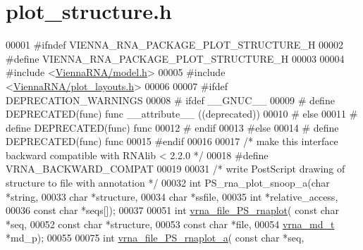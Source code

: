 \hypertarget{plot__structure_8h_source}{}\section{plot\+\_\+structure.\+h}
\label{plot__structure_8h_source}

\begin{DoxyCode}
00001 \textcolor{preprocessor}{#ifndef VIENNA\_RNA\_PACKAGE\_PLOT\_STRUCTURE\_H}
00002 \textcolor{preprocessor}{#define VIENNA\_RNA\_PACKAGE\_PLOT\_STRUCTURE\_H}
00003 
00004 \textcolor{preprocessor}{#include <\hyperlink{model_8h}{ViennaRNA/model.h}>}
00005 \textcolor{preprocessor}{#include <\hyperlink{plot__layouts_8h}{ViennaRNA/plot\_layouts.h}>}
00006 
00007 \textcolor{preprocessor}{#ifdef DEPRECATION\_WARNINGS}
00008 \textcolor{preprocessor}{# ifdef \_\_GNUC\_\_}
00009 \textcolor{preprocessor}{#  define DEPRECATED(func) func \_\_attribute\_\_ ((deprecated))}
00010 \textcolor{preprocessor}{# else}
00011 \textcolor{preprocessor}{#  define DEPRECATED(func) func}
00012 \textcolor{preprocessor}{# endif}
00013 \textcolor{preprocessor}{#else}
00014 \textcolor{preprocessor}{# define DEPRECATED(func) func}
00015 \textcolor{preprocessor}{#endif}
00016 
00017 \textcolor{comment}{/* make this interface backward compatible with RNAlib < 2.2.0 */}
00018 \textcolor{preprocessor}{#define VRNA\_BACKWARD\_COMPAT}
00019 
00031 \textcolor{comment}{/* write PostScript drawing of structure to file with annotation */}
00032 \textcolor{keywordtype}{int} PS\_rna\_plot\_snoop\_a(\textcolor{keywordtype}{char} *\textcolor{keywordtype}{string},
00033                         \textcolor{keywordtype}{char} *structure,
00034                         \textcolor{keywordtype}{char} *ssfile,
00035                         \textcolor{keywordtype}{int} *relative\_access,
00036                         \textcolor{keyword}{const} \textcolor{keywordtype}{char} *seqs[]);
00037 
00051 \textcolor{keywordtype}{int} \hyperlink{group__plotting__utils_gabdc8f6548ba4a3bc3cd868ccbcfdb86a}{vrna\_file\_PS\_rnaplot}( \textcolor{keyword}{const} \textcolor{keywordtype}{char} *seq,
00052                           \textcolor{keyword}{const} \textcolor{keywordtype}{char} *structure,
00053                           \textcolor{keyword}{const} \textcolor{keywordtype}{char} *file,
00054                           \hyperlink{structvrna__md__s}{vrna\_md\_t}  *md\_p);
00055 
00075 \textcolor{keywordtype}{int} \hyperlink{group__plotting__utils_ga139a31dd0ba9fc6612431f67de901c31}{vrna\_file\_PS\_rnaplot\_a}( \textcolor{keyword}{const} \textcolor{keywordtype}{char} *seq,

\end{DoxyCode}

